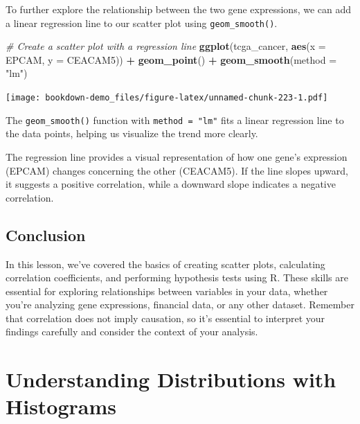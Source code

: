 \documentclass[
]{book}
\newenvironment{Shaded}{\begin{snugshade}}{\end{snugshade}}
\newcommand{\AttributeTok}[1]{\textcolor[rgb]{0.13,0.29,0.53}{#1}}
\newcommand{\CommentTok}[1]{\textcolor[rgb]{0.56,0.35,0.01}{\textit{#1}}}
\newcommand{\FunctionTok}[1]{\textcolor[rgb]{0.13,0.29,0.53}{\textbf{#1}}}
\newcommand{\NormalTok}[1]{#1}
\newcommand{\SpecialCharTok}[1]{\textcolor[rgb]{0.81,0.36,0.00}{\textbf{#1}}}
\newcommand{\StringTok}[1]{\textcolor[rgb]{0.31,0.60,0.02}{#1}}
\begin{document}
To further explore the relationship between the two gene expressions, we can add a linear regression line to our scatter plot using \texttt{geom\_smooth()}.

\begin{Shaded}
\begin{Highlighting}[]
\CommentTok{\# Create a scatter plot with a regression line}
\FunctionTok{ggplot}\NormalTok{(tcga\_cancer, }\FunctionTok{aes}\NormalTok{(}\AttributeTok{x =}\NormalTok{ EPCAM, }\AttributeTok{y =}\NormalTok{ CEACAM5)) }\SpecialCharTok{+}
  \FunctionTok{geom\_point}\NormalTok{() }\SpecialCharTok{+}
  \FunctionTok{geom\_smooth}\NormalTok{(}\AttributeTok{method =} \StringTok{"lm"}\NormalTok{)}
\end{Highlighting}
\end{Shaded}

\texttt{[image: bookdown-demo\_files/figure-latex/unnamed-chunk-223-1.pdf]}

The \texttt{geom\_smooth()} function with \texttt{method\ =\ "lm"} fits a linear regression line to the data points, helping us visualize the trend more clearly.

The regression line provides a visual representation of how one gene's expression (EPCAM) changes concerning the other (CEACAM5). If the line slopes upward, it suggests a positive correlation, while a downward slope indicates a negative correlation.

\hypertarget{conclusion-22}{%
\subsection{Conclusion}\label{conclusion-22}}

In this lesson, we've covered the basics of creating scatter plots, calculating correlation coefficients, and performing hypothesis tests using R. These skills are essential for exploring relationships between variables in your data, whether you're analyzing gene expressions, financial data, or any other dataset. Remember that correlation does not imply causation, so it's essential to interpret your findings carefully and consider the context of your analysis.

\hypertarget{understanding-distributions-with-histograms}{%
\section{Understanding Distributions with Histograms}\label{understanding-distributions-with-histograms}}
\end{document}
